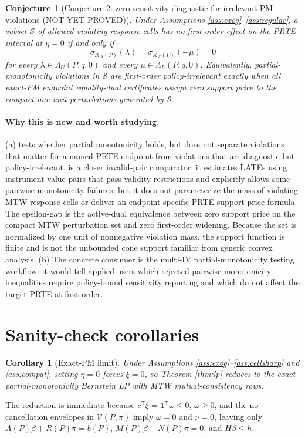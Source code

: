 \documentclass[11pt]{article}
\newcommand{\transpose}{\mathsf{T}}
\theoremstyle{definition}
\theoremstyle{plain}
\newtheorem{conjecture}{Conjecture}
\newtheorem{corollary}{Corollary}
\theoremstyle{remark}
\begin{document}
\begin{conjecture}[Conjecture 2: zero-sensitivity diagnostic for irrelevant PM violations (NOT YET PROVED)]\label{conj:zero}
Under Assumptions \ref{ass:exog}--\ref{ass:regular}, a subset \(\mathcal S\) of allowed violating response cells has no first-order effect on the PRTE interval at \(\eta=0\) if and only if
\[
\sigma_{\mathcal K_{\mathcal S}(P)}(\lambda)=
\sigma_{\mathcal K_{\mathcal S}(P)}(-\mu)=0
\]
for every \(\lambda\in\Lambda_U(P,q,0)\) and every \(\mu\in\Lambda_L(P,q,0)\).  Equivalently, partial-monotonicity violations in \(\mathcal S\) are first-order policy-irrelevant exactly when all exact-PM endpoint equality-dual certificates assign zero support price to the compact one-unit perturbations generated by \(\mathcal S\).
\end{conjecture}
\paragraph{Why this is new and worth studying.}
(a) \citet{JiangSun2023} tests whether partial monotonicity holds, but does not separate violations that matter for a named PRTE endpoint from violations that are diagnostic but policy-irrelevant.  \citet{SunWuthrich2025} is a closer invalid-pair comparator: it estimates LATEs using instrument-value pairs that pass validity restrictions and explicitly allows some pairwise monotonicity failures, but it does not parameterize the mass of violating MTW response cells or deliver an endpoint-specific PRTE support-price formula.  The epsilon-gap is the active-dual equivalence between zero support price on the compact MTW perturbation set and zero first-order widening.  Because the set is normalized by one unit of nonnegative violation mass, the support function is finite and is not the unbounded cone support familiar from generic convex analysis.  (b) The concrete consumer is the multi-IV partial-monotonicity testing workflow: it would tell applied users which rejected pairwise monotonicity inequalities require policy-bound sensitivity reporting and which do not affect the target PRTE at first order.

\section{Sanity-check corollaries}
\begin{corollary}[Exact-PM limit]\label{cor:eta0}
Under Assumptions \ref{ass:exog}--\ref{ass:cellsharp} and \ref{ass:compat}, setting \(\eta=0\) forces \(\xi=0\), so Theorem \ref{thm:lp} reduces to the exact partial-monotonicity Bernstein LP with MTW mutual-consistency rows.
\end{corollary}
The reduction is immediate because \(c^\transpose\xi=\mathbf 1^\transpose\omega\le0\), \(\omega\ge0\), and the no-cancellation envelopes in \(\mathcal V(P,\pi)\) imply \(\omega=0\) and \(\nu=0\), leaving only \(A(P)\beta+R(P)\pi=b(P)\), \(M(P)\beta+N(P)\pi=0\), and \(H\beta\le h\).
\end{document}
